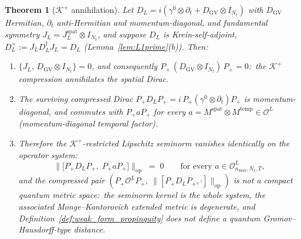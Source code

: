 \documentclass[11pt,a4paper]{article}
\theoremstyle{plain}
\newtheorem{theorem}{Theorem}[section]
\theoremstyle{definition}
\newcommand{\nmax}{n_{\max}}
\newcommand{\Nt}{N_{t}}
\newcommand{\Krein}{\mathcal{K}}
\newcommand{\Op}{\mathcal{O}}
\newcommand{\opnorm}[1]{\lVert #1 \rVert_{\mathrm{op}}}
\newcommand{\DGV}{D_{\mathrm{GV}}}
\newcommand{\DL}{D_{L}}
\newcommand{\JL}{J_{L}}
\newcommand{\Kplus}{\Krein^{+}}
\newcommand{\Pplus}{P_{+}}
\newcommand{\spat}{\mathrm{spat}}
\newcommand{\temp}{\mathrm{temp}}
\begin{document}
\begin{theorem}[$\Kplus$ annihilation]\label{thm:kplus_annihilation}
Let $\DL = i(\gamma^{0} \otimes \partial_{t} + \DGV \otimes I_{\Nt})$
with $\DGV$ Hermitian, $\partial_{t}$ anti-Hermitian and
momentum-diagonal, and fundamental symmetry
$\JL = \JL^{\spat} \otimes I_{\Nt}$, and suppose $\DL$ is
Krein-self-adjoint, $\DL^{\times} := \JL \DL^{\dagger} \JL = \DL$
(Lemma~\ref{lem:L1prime}(b)). Then:
\begin{enumerate}
\item[(i)] $\{\JL,\, \DGV \otimes I_{\Nt}\} = 0$, and consequently
$\Pplus\,(\DGV \otimes I_{\Nt})\,\Pplus = 0$:\ the $\Kplus$
compression annihilates the spatial Dirac.
\item[(ii)] The surviving compressed Dirac
$\Pplus \DL \Pplus = i\,\Pplus(\gamma^{0} \otimes \partial_{t})\Pplus$
is momentum-diagonal, and commutes with $\Pplus a \Pplus$ for every
$a = M^{\spat} \otimes M^{\temp} \in \Op^{L}$ (momentum-diagonal
temporal factor).
\item[(iii)] Therefore the $\Kplus$-restricted Lipschitz seminorm
vanishes identically on the operator system:
\begin{equation}\label{eq:annihilation}
   \opnorm{\bigl[\Pplus \DL \Pplus,\; \Pplus a \Pplus\bigr]} \;=\; 0
   \qquad \text{for every } a \in \Op^{L}_{\nmax,\Nt,T},
\end{equation}
and the compressed pair
$(\Pplus\Op^{L}\Pplus,\ \opnorm{[\Pplus\DL\Pplus, \cdot]})$ is not a
compact quantum metric space:\ the seminorm kernel is the whole
system, the associated Monge--Kantorovich extended metric is
degenerate, and Definition~\ref{def:weak_form_propinquity} does not
define a quantum Gromov--Hausdorff-type distance.
\end{enumerate}
\end{theorem}
\end{document}
